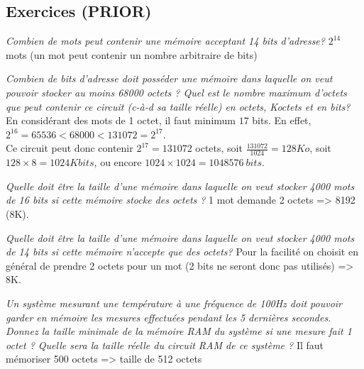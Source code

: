 \subsection{Exercices (PRIOR)}
{
\textit{Combien de mots peut contenir une mémoire acceptant 14 bits d’adresse?}
}
{%
$2^{14}$ mots (un mot peut contenir un nombre arbitraire de bits)
}

{
\textit{Combien de bits d’adresse doit posséder une mémoire dans laquelle on veut pouvoir stocker au moins 68000 octets ? Quel est le nombre maximum d’octets que peut contenir ce circuit (c-à-d sa taille réelle) en octets, Koctets et en bits?}
}
{%
En considérant des mots de 1 octet, il faut minimum $17$ bits. En effet, $2^{16}=65536<68000<131072=2^{17}$.\\
Ce circuit peut donc contenir $2^{17}=131072$ octets, soit $\frac{131072}{1024}=128Ko$, soit $128\times 8= 1024 Kbits$, ou encore $1024\times 1024=1048576\ bits$.
}

{
\textit{Quelle doit être la taille d’une mémoire dans laquelle on veut stocker 4000 mots de 16 bits si cette mémoire stocke des octets ?}
}
{%
1 mot demande 2 octets => 8192 (8K).
}

{
\textit{Quelle doit être la taille d’une mémoire dans laquelle on veut stocker 4000 mots de 14 bits si cette mémoire n’accepte que des octets?}
}
{%
Pour la facilité on choisit en général de prendre 2 octets pour un mot (2 bits ne seront donc pas utilisés) => 8K.
}

{
\textit{Un système mesurant une température à une fréquence de 100Hz doit pouvoir garder en mémoire les mesures effectuées pendant les 5 dernières secondes. Donnez la taille minimale de la mémoire RAM du système si une mesure fait 1 octet ? Quelle sera la taille réelle du circuit RAM de ce système ?}
}
{%
Il faut mémoriser 500 octets => taille de 512 octets
}


